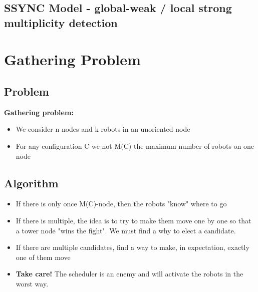\documentclass{beamer}
\begin{document}
\subsection{SSYNC Model - global-weak / local strong multiplicity detection}

\section{Gathering Problem}
\subsection{Problem}
\begin{frame}
\textbf{Gathering problem:}

	\begin{itemize}
		\item<2-> We consider n nodes and k robots in an unoriented node
		\item<3-> For any configuration C we not M(C) the maximum number of robots on one node
	\end{itemize}
	
\end{frame}

\subsection{Algorithm}
\begin{frame}
	\begin{itemize}
		\item<1-> If there is only once M(C)-node, then the robots "know" where to go
		\item<2-> If there is multiple, the idea is to try to make them move one by one so that a tower node "wins the fight". We must find a why to elect a candidate.
		\item<3-> If there are multiple candidates, find a way to make, in expectation, exactly one of them move
		\item<4-> \textbf{Take care!} The scheduler is an enemy and will activate the robots in the worst way.
	\end{itemize}
	
\end{frame}
\end{document}
